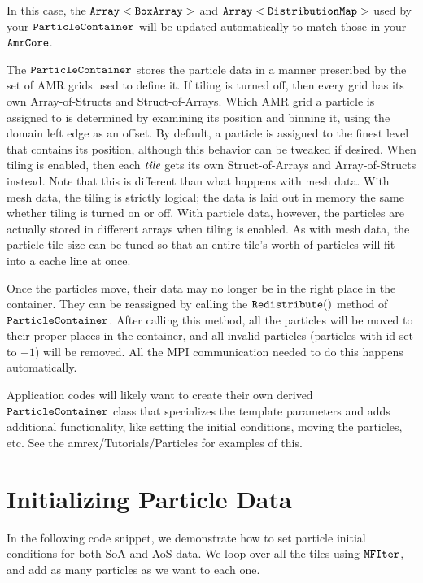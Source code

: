 In this case, the $\tt{Array<BoxArray>}$ and $\tt{Array<DistributionMap>}$ used by your $\tt{ParticleContainer}$ will be updated automatically to match those in
your $\tt{AmrCore}$. 

The $\tt{ParticleContainer}$ stores the particle data in a manner prescribed by the set of AMR grids used to define it. If tiling is turned off, then every grid has its own 
Array-of-Structs and Struct-of-Arrays. Which AMR grid a particle is assigned to is determined by examining its position and binning it, using the domain left edge as an offset. 
By default, a particle is assigned to the finest level that contains its position, although this behavior can be tweaked if desired. 
When tiling is enabled, then each $\emph{tile}$ gets its own Struct-of-Arrays and Array-of-Structs instead. Note that this is different than what happens with mesh data. With mesh data, the tiling is strictly logical; the data is laid out in memory the same whether tiling is turned on or off. With particle data, however, the particles are actually stored in different arrays when tiling is enabled. As with mesh data, the particle tile size can be tuned so that an entire tile's worth of particles will fit into a cache line at once.

Once the particles move, their data may no longer be in the right place in the container. They can be reassigned by calling the $\tt{Redistribute()}$ method of $\tt{ParticleContainer}$.
After calling this method, all the particles will be moved to their proper places in the container, and all invalid particles (particles with id set to $-1$) will be removed. All the 
MPI communication needed to do this happens automatically.

Application codes will likely want to create their own derived $\tt{ParticleContainer}$ class that specializes the template parameters and adds additional 
functionality, like setting the initial conditions, moving the particles, etc. See the amrex/Tutorials/Particles for examples of this.

\section{Initializing Particle Data}
\label{sec:Particles:Initializing}

In the following code snippet, we demonstrate how to set particle initial conditions for both SoA and AoS data. We loop over all the tiles using $\tt{MFIter}$, and add
as many particles as we want to each one.

